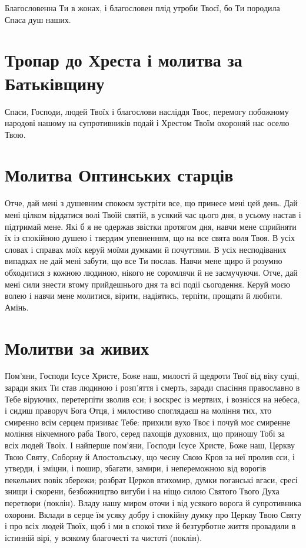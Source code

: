 \documentclass[chapters.tex]{subfiles}
\begin{document}
Благословенна Ти в жонах, і благословен плід утроби Твоєї, бо Ти породила Спаса душ наших.

\section{Тропар до Хреста і молитва за Батьківщину}
Спаси, Господи, людей Твоїх і благослови насліддя Твоє, перемогу побожному народові нашому на супротивників подай і Хрестом Твоїм охороняй нас оселю Твою.

\section{Молитва Оптинських старців}
Отче, дай мені з душевним спокоєм зустріти все, що принесе мені цей день. Дай мені цілком віддатися волі Твоїй святій, в усякий час цього дня, в усьому настав і підтримай мене. Які б я не одержав звістки протягом дня, навчи мене сприйняти їх із спокійною душею і твердим упевненням, що на все свята воля Твоя. В усіх словах і справах моїх керуй моїми думками й почуттями. В усіх несподіваних випадках не дай мені забути, що все Ти послав. Навчи мене щиро й розумно обходитися з кожною людиною, нікого не соромлячи й не засмучуючи. Отче, дай мені сили знести втому прийдешнього дня та всі події сьогодення. Керуй моєю волею і навчи мене молитися, вірити, надіятись, терпіти, прощати й любити. Амінь.

\section{Молитви за живих}
Пом’яни, Господи Ісусе Христе, Боже наш, милості й щедроти Твої від віку сущі, заради яких Ти став людиною і розп’яття і смерть, заради спасіння православно в Тебе віруючих, перетерпіти зволив єси; і воскрес із мертвих, і вознісся на небеса, і сидиш праворуч Бога Отця, і милостиво споглядаєш на моління тих, хто смиренно всім серцем призиває Тебе: прихили вухо Твоє і почуй моє смиренне моління нікчемного раба Твого, серед пахощів духовних, що приношу Тобі за всіх людей Твоїх. І найперше пом’яни, Господи Ісусе Христе, Боже наш, Церкву Твою Святу, Соборну й Апостольську, що чесну Свою Кров за неї пролив єси, і утверди, і зміцни, і пошир, збагати, замири, і непереможною від ворогів пекельних повік збережи; розбрат Церков втихомир, думки поганські вгаси, єресі знищи і скорени, безбожництво вигуби і на ніщо силою Святого Твого Духа перетвори (поклін). Владу нашу миром оточи і від усякого ворога й супротивника охорони. Вклади в серце їм усяку добру і спокійну думку про Церкву Твою Святу і про всіх людей Твоїх, щоб і ми в спокої тихе й безтурботне життя провадили в істинній вірі, у всякому благочесті та чистоті (поклін).
\end{document}
